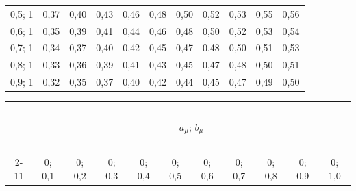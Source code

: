 \begin{table}[b]
\begin{center}
\begin{tabular}{|c|c|c|c|c|c|c|c|c|c|c|}
 0,5;  1& 0,37& 0,40& 0,43& 0,46& 0,48& 0,50& 0,52& 0,53& 0,55& 0,56\\


 0,6;  1& 0,35& 0,39& 0,41& 0,44& 0,46& 0,48& 0,50& 0,52& 0,53& 0,54\\


 0,7;  1& 0,34& 0,37& 0,40& 0,42& 0,45& 0,47& 0,48& 0,50& 0,51& 0,53\\


 0,8;  1& 0,33& 0,36& 0,39& 0,41& 0,43& 0,45& 0,47& 0,48& 0,50& 0,51\\


 0,9;  1& 0,32& 0,35& 0,37& 0,40& 0,42& 0,44& 0,45& 0,47& 0,49& 0,50\\


\hline


\end{tabular}


\end{center}






\vspace*{-6pt}


\begin{center}




\vspace*{2ex}





\tabcolsep=4.4pt


\begin{tabular}{|c|c|c|c|c|c|c|c|c|c|c|}


\hline


&\multicolumn{10}{c|}{\ }\\[-9pt]


&\multicolumn{10}{c|}{$a_{\mu}$; $b_{\mu}$}\\


&\multicolumn{10}{c|}{\ }\\[-9pt]


\cline{2-11}


\multicolumn{1}{|c|}{\raisebox{6pt}[0pt][0pt]{$a_{\lambda}$; $b_{\lambda}$}}


& 0;  0,1& 0;  0,2& 0;  0,3& 0;  0,4& 0;  0,5& 0;  0,6& 0;  0,7& 0;  0,8& 0;  0,9& 0;  1,0\\



\end{tabular}
\end{center}
\end{table}
